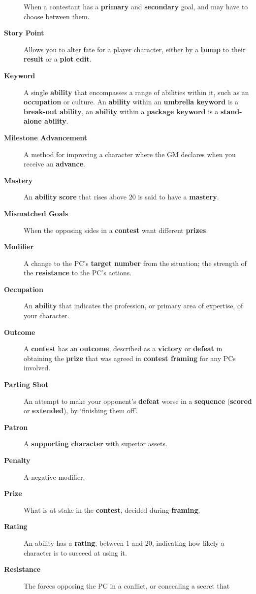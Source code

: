 \documentclass[
  11pt,
]{article}
\begin{document}
\begin{description}
When a contestant has a \textbf{primary} and \textbf{secondary} goal,
and may have to choose between them.
\item[\textbf{Story Point}]
Allows you to alter fate for a player character, either by a
\textbf{bump} to their \textbf{result} or a \textbf{plot edit}.
\item[\textbf{Keyword}]
A single \textbf{ability} that encompasses a range of abilities within
it, such as an \textbf{occupation} or culture. An \textbf{ability}
within an \textbf{umbrella keyword} is a \textbf{break-out ability}, an
\textbf{ability} within a \textbf{package keyword} is a
\textbf{stand-alone ability}.
\item[\textbf{Milestone Advancement}]
A method for improving a character where the GM declares when you
receive an \textbf{advance}.
\item[\textbf{Mastery}]
An \textbf{ability} \textbf{score} that rises above 20 is said to have a
\textbf{mastery}.
\item[\textbf{Mismatched Goals}]
When the opposing sides in a \textbf{contest} want different
\textbf{prizes}.
\item[\textbf{Modifier}]
A change to the PC's \textbf{target number} from the situation; the
strength of the \textbf{resistance} to the PC's actions.
\item[\textbf{Occupation}]
An \textbf{ability} that indicates the profession, or primary area of
expertise, of your character.
\item[\textbf{Outcome}]
A \textbf{contest} has an \textbf{outcome}, described as a
\textbf{victory} or \textbf{defeat} in obtaining the \textbf{prize} that
was agreed in \textbf{contest framing} for any PCs involved.
\item[\textbf{Parting Shot}]
An attempt to make your opponent's \textbf{defeat} worse in a
\textbf{sequence} (\textbf{scored} or \textbf{extended}), by `finishing
them off'.
\item[\textbf{Patron}]
A \textbf{supporting character} with superior assets.
\item[\textbf{Penalty}]
A negative modifier.
\item[\textbf{Prize}]
What is at stake in the \textbf{contest}, decided during
\textbf{framing}.
\item[\textbf{Rating}]
An ability has a \textbf{rating}, between 1 and 20, indicating how
likely a character is to succeed at using it.
\item[\textbf{Resistance}]
The forces opposing the PC in a conflict, or concealing a secret that

\end{description}
\end{document}
